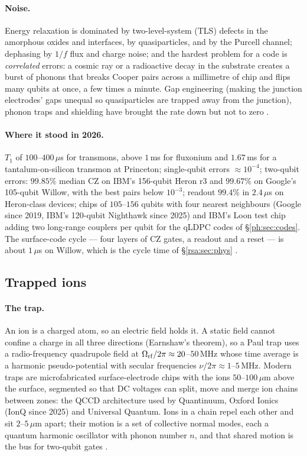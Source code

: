 \paragraph{Noise.} Energy relaxation is dominated by two-level-system (TLS) defects in the
amorphous oxides and interfaces, by quasiparticles, and by the Purcell channel; dephasing by $1/f$
flux and charge noise; and the hardest problem for a code is \emph{correlated} errors: a cosmic
ray or a radioactive decay in the substrate creates a burst of phonons that breaks Cooper pairs
across a millimetre of chip and flips many qubits at once, a few times a minute. Gap engineering
(making the junction electrodes' gaps unequal so quasiparticles are trapped away from the
junction), phonon traps and shielding have brought the rate down but not to zero
\cite{ph:uqt26}.

\paragraph{Where it stood in 2026.} $T_1$ of $100$--$400\,\mu$s for transmons, above $1$\,ms for
fluxonium and $1.67$\,ms for a tantalum-on-silicon transmon at Princeton; single-qubit errors
$\approx10^{-4}$; two-qubit errors: $99.85\%$ median CZ on IBM's 156-qubit Heron r3 and $99.67\%$
on Google's 105-qubit Willow, with the best pairs below $10^{-3}$; readout $99.4\%$ in $2.4\,\mu$s
on Heron-class devices; chips of $105$--$156$ qubits with four nearest neighbours (Google since
2019, IBM's 120-qubit Nighthawk since 2025) and IBM's Loon test chip adding two long-range
couplers per qubit for the qLDPC codes of \S\ref{ph:sec:codes}. The surface-code cycle ---
four layers of CZ gates, a readout and a reset --- is about $1\,\mu$s on Willow, which is the
cycle time of \S\ref{rsa:sec:phys} \cite{ph:uqt26,ph:willow24}.

\subsection{Trapped ions}\label{ph:sec:ions}

\paragraph{The trap.} An ion is a charged atom, so an electric field holds it. A static field
cannot confine a charge in all three directions (Earnshaw's theorem), so a Paul trap uses a
radio-frequency quadrupole field at $\Omega_{\rm rf}/2\pi\approx20$--$50$\,MHz whose time average
is a harmonic pseudo-potential with secular frequencies $\nu/2\pi\approx1$--$5$\,MHz. Modern traps
are microfabricated surface-electrode chips with the ions $50$--$100\,\mu$m above the surface,
segmented so that DC voltages can split, move and merge ion chains between zones: the QCCD
architecture used by Quantinuum, Oxford Ionics (IonQ since 2025) and Universal Quantum. Ions in a
chain repel each other and sit $2$--$5\,\mu$m apart; their motion is a set of collective normal
modes, each a quantum harmonic oscillator with phonon number $n$, and that shared motion is the
bus for two-qubit gates \cite{ph:uqt26}.

